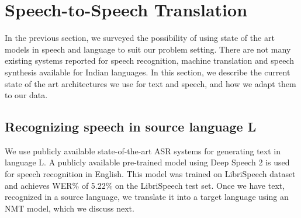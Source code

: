 \documentclass[sigconf]{acmart}
\begin{document}
\section{Speech-to-Speech Translation}
\label{section:adaptations}

In the previous section, we surveyed the possibility of using state of the art models in speech and language to suit our problem setting. There are not many existing systems reported for speech recognition, machine translation and speech synthesis available for Indian languages. In this section, we describe the current state of the art architectures we use for text and speech, and how we adapt them to our data. 




\subsection{Recognizing speech in source language L}
We use publicly available state-of-the-art ASR systems for generating text in language L. A publicly available pre-trained model using Deep Speech 2 is used for speech recognition in English. This model was trained on LibriSpeech dataset and achieves WER\% of 5.22\% on the LibriSpeech test set. Once we have text, recognized in a source language, we translate it into a target language using an NMT model, which we discuss next.
\end{document}
